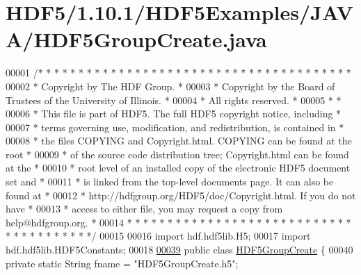 \hypertarget{_h_d_f5_21_810_81_2_h_d_f5_examples_2_j_a_v_a_2_h_d_f5_group_create_8java_source}{}\section{H\+D\+F5/1.10.1/\+H\+D\+F5\+Examples/\+J\+A\+V\+A/\+H\+D\+F5\+Group\+Create.java}
\label{_h_d_f5_21_810_81_2_h_d_f5_examples_2_j_a_v_a_2_h_d_f5_group_create_8java_source}

\begin{DoxyCode}
00001 \textcolor{comment}{/* * * * * * * * * * * * * * * * * * * * * * * * * * * * * * * * * * * * * * *}
00002 \textcolor{comment}{ * Copyright by The HDF Group.                                               *}
00003 \textcolor{comment}{ * Copyright by the Board of Trustees of the University of Illinois.         *}
00004 \textcolor{comment}{ * All rights reserved.                                                      *}
00005 \textcolor{comment}{ *                                                                           *}
00006 \textcolor{comment}{ * This file is part of HDF5.  The full HDF5 copyright notice, including     *}
00007 \textcolor{comment}{ * terms governing use, modification, and redistribution, is contained in    *}
00008 \textcolor{comment}{ * the files COPYING and Copyright.html.  COPYING can be found at the root   *}
00009 \textcolor{comment}{ * of the source code distribution tree; Copyright.html can be found at the  *}
00010 \textcolor{comment}{ * root level of an installed copy of the electronic HDF5 document set and   *}
00011 \textcolor{comment}{ * is linked from the top-level documents page.  It can also be found at     *}
00012 \textcolor{comment}{ * http://hdfgroup.org/HDF5/doc/Copyright.html.  If you do not have          *}
00013 \textcolor{comment}{ * access to either file, you may request a copy from help@hdfgroup.org.     *}
00014 \textcolor{comment}{ * * * * * * * * * * * * * * * * * * * * * * * * * * * * * * * * * * * * * * */}
00015 
00016 \textcolor{keyword}{import} hdf.hdf5lib.H5;
00017 \textcolor{keyword}{import} hdf.hdf5lib.HDF5Constants;
00018 
\hyperlink{class_h_d_f5_group_create}{00039} \textcolor{keyword}{public} \textcolor{keyword}{class }\hyperlink{class_h_d_f5_group_create}{HDF5GroupCreate} \{
00040     \textcolor{keyword}{private} \textcolor{keyword}{static} String fname = \textcolor{stringliteral}{"HDF5GroupCreate.h5"};

\end{DoxyCode}
